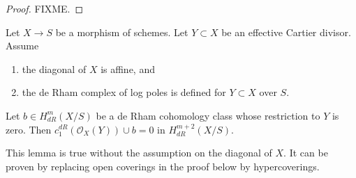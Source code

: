 \begin{proof}
FIXME.
\end{proof}

\begin{lemma}
\label{lemma-log-complex-consequence}
Let $X \to S$ be a morphism of schemes. Let $Y \subset X$ be an effective
Cartier divisor. Assume
\begin{enumerate}
\item the diagonal of $X$ is affine, and
\item the de Rham complex of log poles is defined for
$Y \subset X$ over $S$.
\end{enumerate}
Let $b \in H^m_{dR}(X/S)$ be a de Rham cohomology class whose restriction
to $Y$ is zero. Then $c_1^{dR}(\mathcal{O}_X(Y)) \cup b = 0$ in
$H^{m + 2}_{dR}(X/S)$.
\end{lemma}

\noindent
This lemma is true without the assumption on the diagonal of $X$.
It can be proven by replacing open coverings in the proof below
by hypercoverings.

